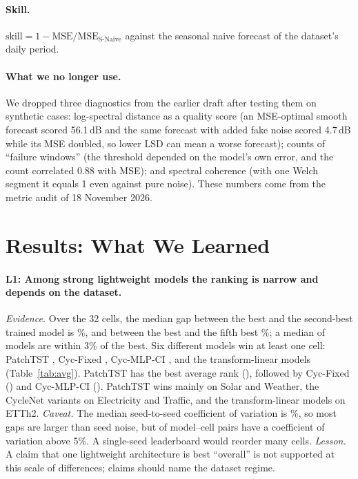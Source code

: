 \documentclass[11pt,a4paper]{article}
\newcommand{\lrn}[1]{\textbf{L#1}}
\begin{document}
\paragraph{Skill.} $\text{skill}=1-\mathrm{MSE}/\mathrm{MSE}_{\text{S-Naive}}$ against the seasonal naive forecast of the dataset's daily period.

\paragraph{What we no longer use.} We dropped three diagnostics from the earlier draft after testing them on synthetic cases: log-spectral distance as a quality score (an MSE-optimal smooth forecast scored 56.1\,dB and the same forecast with added fake noise scored 4.7\,dB while its MSE doubled, so lower LSD can mean a worse forecast); counts of ``failure windows'' (the threshold depended on the model's own error, and the count correlated 0.88 with MSE); and spectral coherence (with one Welch segment it equals 1 even against pure noise). These numbers come from the metric audit of 18 November 2026.

\section{Results: What We Learned}
\label{sec:results}

\begin{table}[t]
\centering
\caption{Test MSE averaged over the four horizons (seed means), and average rank over the 32 cells among the 17 trained models. Bold: best trained model; underline: second best. Full per-horizon results in Table~\ref{tab:full}.}
\label{tab:avg}
\resizebox{\textwidth}{!}{}
\end{table}

\paragraph{\lrn{1}: Among strong lightweight models the ranking is narrow and depends on the dataset.}
\emph{Evidence.} Over the 32 cells, the median gap between the best and the second-best trained model is \medGapSecond\%, and between the best and the fifth best \medGapFifth\%; a median of \medWithinThree{} models are within 3\% of the best. Six different models win at least one cell: PatchTST \winsPatchTST, Cyc-Fixed \winsCycFixed, Cyc-MLP-CI \winsCycMLPCI, and the transform-linear models \winsTF{} (Table~\ref{tab:avg}). PatchTST has the best average rank (\rankPatchTST), followed by Cyc-Fixed (\rankCycFixed) and Cyc-MLP-CI (\rankCycMLPCI). PatchTST wins mainly on Solar and Weather, the CycleNet variants on Electricity and Traffic, and the transform-linear models on ETTh2.
\emph{Caveat.} The median seed-to-seed coefficient of variation is \medSeedCV\%, so most gaps are larger than seed noise, but \nUnstable{} of \nSeedCells{} model--cell pairs have a coefficient of variation above 5\%. A single-seed leaderboard would reorder many cells.
\emph{Lesson.} A claim that one lightweight architecture is best ``overall'' is not supported at this scale of differences; claims should name the dataset regime.
\end{document}
